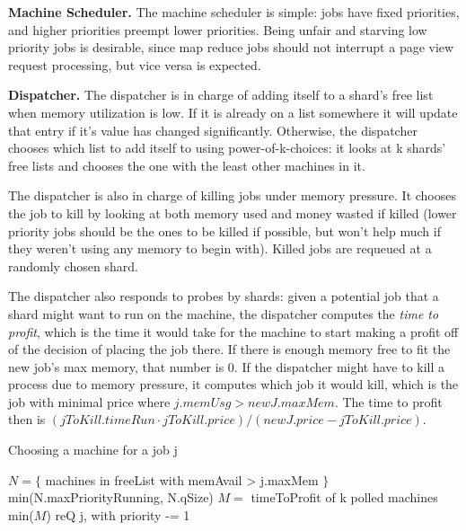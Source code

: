 \textbf{Machine Scheduler.}
The machine scheduler is simple: jobs have fixed priorities, and higher
priorities preempt lower priorities. Being unfair and starving low priority
jobs is desirable, since map reduce jobs should not interrupt a page view
request processing, but vice versa is expected.


\textbf{Dispatcher.}
The dispatcher is in charge of adding itself to a shard's free list when memory
utilization is low. If it is already on a list somewhere it will update that
entry if it's value has changed significantly. Otherwise, the dispatcher chooses
which list to add itself to using power-of-k-choices: it looks at k shards' free
lists and chooses the one with the least other machines in it. 

The dispatcher is also in charge of killing jobs under memory pressure. It
chooses the job to kill by looking at both memory used and money wasted if
killed (lower priority jobs should be the ones to be killed if possible, but
won't help much if they weren't using any memory to begin with). Killed jobs are
requeued at a randomly chosen shard.

The dispatcher also responds to probes by shards: given a potential job that a
shard might want to run on the machine, the dispatcher computes the \textit{time
to profit}, which is the time it would take for the machine to start making a
profit off of the decision of placing the job there. If there is enough memory
free to fit the new job's max memory, that number is 0. If the dispatcher might
have to kill a process due to memory pressure, it computes which job it would
kill, which is the job with minimal price where $j.memUsg > newJ.maxMem$. The
time to profit then is $(jToKill.timeRun \cdot jToKill.price) / (newJ.price
- jToKill.price)$.


\begin{algorithm}[t]
\caption{Choosing a machine for a job j}\label{alg:place}
\begin{algorithmic}
    \State$N = \{ $ machines in freeList with memAvail > j.maxMem $\}$
     \\
        \Return$ $min(N.maxPriorityRunning, N.qSize)
    \EndIf
    \State$M = $ timeToProfit of k polled machines
     \\
        \Return$ $min($M$)
    \Else
        \State$ $reQ j, with priority -= 1
    \EndIf
\end{algorithmic}
\end{algorithm}


